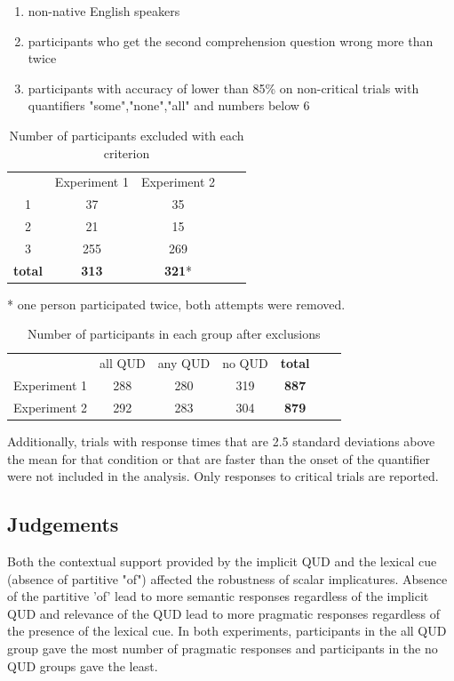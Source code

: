 \documentclass[12pt]{article}
\begin{document}
\begin{enumerate}[noitemsep]
\item non-native English speakers 
\item participants who get the second comprehension question wrong more than twice 
\item participants with accuracy of lower than 85\% on non-critical trials with quantifiers "some","none","all" and numbers below 6
\end{enumerate}

\begin{table}[h]
    \centering
    \caption {Number of participants excluded with each criterion}
    \begin{tabular}{ccccc}
    & Experiment 1 & Experiment 2 \\
    1 & 37 & 35 \\
    2 & 21 & 15 \\
    3 & 255 & 269 \\
    \textbf{total} & \textbf{313} & \textbf{321}* \\
    \end{tabular} 
\end{table}
\vspace{-6mm}
* one person participated twice, both attempts were removed.

\medskip

\begin{table}[h]
    \centering
    \caption {Number of participants in each group after exclusions}
    \begin{tabular}{ccccccc}
    & all QUD & any QUD & no QUD & \textbf{total}\\
    Experiment 1 & 288 & 280 & 319 & \textbf{887}\\
    Experiment 2 & 292 & 283 & 304 & \textbf{879}\\
    \end{tabular}
\end{table}

Additionally, trials with response times that are 2.5 standard deviations above the mean for that condition or that are faster than the onset of the quantifier were not included in the analysis. Only responses to critical trials are reported. 


\subsection*{Judgements}
Both the contextual support provided by the implicit QUD and the lexical cue (absence of partitive "of") affected the robustness of scalar implicatures. Absence of the partitive 'of' lead to more semantic responses regardless of the implicit QUD and relevance of the QUD lead to more pragmatic responses regardless of the presence of the lexical cue. In both experiments, participants in the all QUD group gave the most number of pragmatic responses and participants in the no QUD groups gave the least.
\end{document}
